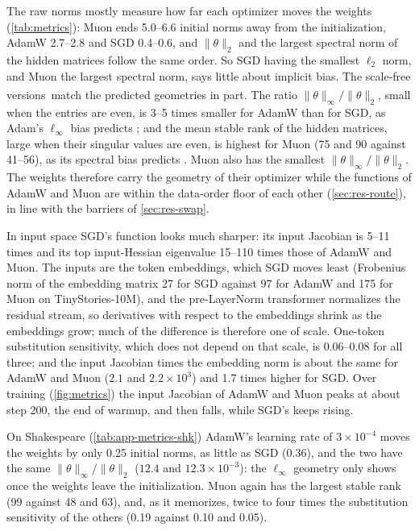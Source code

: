 \documentclass[10pt]{article}
\newcommand{\extra}{\textsuperscript{\dag}}  %
\begin{document}
The raw norms mostly measure how far each optimizer moves the weights (\cref{tab:metrics}): Muon ends 5.0--6.6
initial norms away from the initialization, AdamW 2.7--2.8 and SGD 0.4--0.6, and $\|\theta\|_2$ and the largest
spectral norm of the hidden matrices follow the same order. So SGD having the smallest $\ell_2$ norm, and Muon the
largest spectral norm, says little about implicit bias. The scale-free versions\extra\ match the predicted geometries
in part. The ratio $\|\theta\|_\infty/\|\theta\|_2$, small when the entries are even, is 3--5 times smaller for
AdamW than for SGD, as Adam's $\ell_\infty$ bias predicts \citep{zhang2024adam}; and the mean stable rank of the
hidden matrices, large when their singular values are even, is highest for Muon (75 and 90 against 41--56), as
its spectral bias predicts \citep{fan2025spectral}. Muon also has the smallest $\|\theta\|_\infty/\|\theta\|_2$.
The weights therefore carry the geometry of their optimizer while the functions of AdamW and Muon are within the
data-order floor of each other (\cref{sec:res-route}), in line with the barriers of \cref{sec:res-swap}.

In input space SGD's function looks much sharper: its input Jacobian is 5--11 times and its top input-Hessian
eigenvalue 15--110 times those of AdamW and Muon. The inputs are the token embeddings, which SGD moves least
(Frobenius norm of the embedding matrix 27 for SGD against 97 for AdamW and 175 for Muon on TinyStories-10M), and
the pre-LayerNorm transformer normalizes the residual stream, so derivatives with respect to the embeddings shrink
as the embeddings grow; much of the difference is therefore one of scale. One-token substitution sensitivity,
which does not depend on that scale, is 0.06--0.08 for all three; and the input Jacobian times the embedding
norm is about the same for AdamW and Muon ($2.1$ and $2.2\times10^3$) and 1.7 times higher for SGD. Over training
(\cref{fig:metrics}) the input Jacobian of AdamW and Muon peaks at about step 200, the end of warmup, and then
falls, while SGD's keeps rising.

On Shakespeare (\cref{tab:app-metrics-shk}) AdamW's learning rate of $3\times10^{-4}$ moves the weights by only
0.25 initial norms, as little as SGD (0.36), and the two have the same $\|\theta\|_\infty/\|\theta\|_2$
($12.4$ and $12.3\times10^{-3}$): the $\ell_\infty$ geometry only shows once the weights leave the
initialization. Muon again has the largest stable rank (99 against 48 and 63), and, as it memorizes, twice to
four times the substitution sensitivity of the others (0.19 against 0.10 and 0.05).
\end{document}
